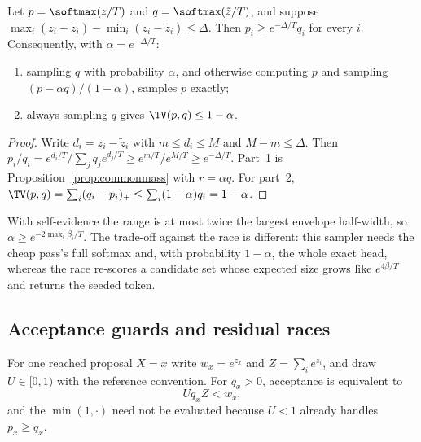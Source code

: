 \begin{proposition}\label{prop:boundedrange}
Let $p=\softmax(z/T)$ and $q=\softmax(\tilde z/T)$, and suppose $\max_i(z_i-\tilde z_i)-\min_i(z_i-\tilde z_i)\le\Delta$. Then $p_i\ge e^{-\Delta/T}q_i$ for every $i$. Consequently, with $\alpha=e^{-\Delta/T}$:
\begin{enumerate}
\item sampling $q$ with probability $\alpha$, and otherwise computing $p$ and sampling $(p-\alpha q)/(1-\alpha)$, samples $p$ exactly;
\item always sampling $q$ gives $\TV(p,q)\le1-\alpha$.
\end{enumerate}
\end{proposition}
\begin{proof}
Write $d_i=z_i-\tilde z_i$ with $m\le d_i\le M$ and $M-m\le\Delta$. Then $p_i/q_i=e^{d_i/T}/\sum_jq_je^{d_j/T}\ge e^{m/T}/e^{M/T}\ge e^{-\Delta/T}$. Part~1 is Proposition~\ref{prop:commonmass} with $r=\alpha q$. For part~2, $\TV(p,q)=\sum_i(q_i-p_i)_+\le\sum_i(1-\alpha)q_i=1-\alpha$.
\end{proof}
With self-evidence the range is at most twice the largest envelope half-width, so $\alpha\ge e^{-2\max_i\beta_i/T}$. The trade-off against the race is different: this sampler needs the cheap pass's full softmax and, with probability $1-\alpha$, the whole exact head, whereas the race re-scores a candidate set whose expected size grows like $e^{4\beta/T}$ and returns the seeded token.

\subsection{Acceptance guards and residual races}\label{sec:guards}\label{app:guards}
For one reached proposal $X=x$ write $w_x=e^{z_x}$ and $Z=\sum_ie^{z_i}$, and draw $U\in[0,1)$ with the reference convention. For $q_x>0$, acceptance is equivalent to
\begin{equation}Uq_xZ<w_x,\label{eq:accept}\end{equation}
and the $\min(1,\cdot)$ need not be evaluated because $U<1$ already handles $p_x\ge q_x$.

